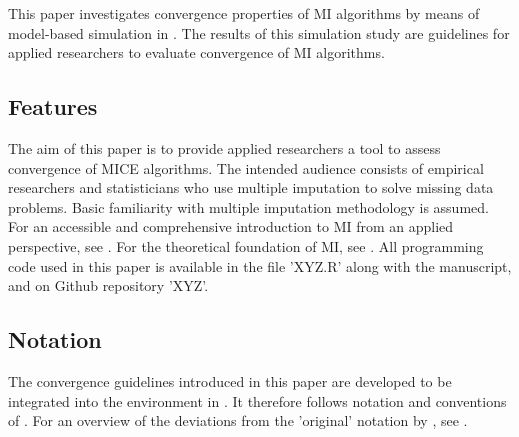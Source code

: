\documentclass[article]{jss}
\begin{document}
This paper investigates convergence properties of MI algorithms by means of model-based simulation in  \cite{R}. The results of this simulation study are guidelines for applied researchers to evaluate convergence of MI algorithms. %


\subsection{Features} \label{sec:features}

The aim of this paper is to provide applied researchers a tool to assess convergence of MICE algorithms. The intended audience consists of empirical researchers and statisticians who use multiple imputation to solve missing data problems. Basic familiarity with multiple imputation methodology is assumed. For an accessible and comprehensive introduction to MI from an applied perspective, see \cite{buur18}. For the theoretical foundation of MI, see \cite{rubin87}. All programming code used in this paper is available in the file 'XYZ.R' along with the manuscript, and on Github repository 'XYZ'. 


\subsection{Notation} \label{sec:notation}

The convergence guidelines introduced in this paper are developed to be integrated into the  environment \cite{mice} in  \cite{R}. It therefore follows notation and conventions of \cite{mice}. For an overview of the deviations from the 'original' notation by \cite{rubin87}, see \cite{buur18}. 
\end{document}
